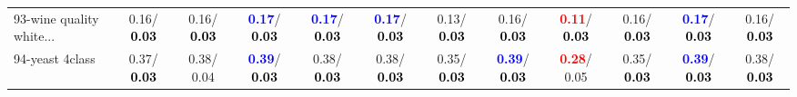 \begin{table}[h]
\begin{center}
{\begin{tabular}{lc|c|c|c|c|c|c|c|c|c|c}
93-wine quality white... &   0.16/\textcolor{black}{\textbf{  0.03}} &   0.16/\textcolor{black}{\textbf{  0.03}} & \textcolor{blue}{\textbf{  0.17}}/\textcolor{black}{\textbf{  0.03}} & \textcolor{blue}{\textbf{  0.17}}/\textcolor{black}{\textbf{  0.03}} & \textcolor{blue}{\textbf{  0.17}}/\textcolor{black}{\textbf{  0.03}} &   0.13/\textcolor{black}{\textbf{  0.03}} &   0.16/\textcolor{black}{\textbf{  0.03}} & \textcolor{red}{\textbf{  0.11}}/\textcolor{black}{\textbf{  0.03}} &   0.16/\textcolor{black}{\textbf{  0.03}} & \textcolor{blue}{\textbf{  0.17}}/\textcolor{black}{\textbf{  0.03}} &   0.16/\textcolor{black}{\textbf{  0.03}} \\
94-yeast 4class &   0.37/\textcolor{black}{\textbf{  0.03}} &   0.38/  0.04 & \textcolor{blue}{\textbf{  0.39}}/\textcolor{black}{\textbf{  0.03}} &   0.38/\textcolor{black}{\textbf{  0.03}} &   0.38/\textcolor{black}{\textbf{  0.03}} &   0.35/\textcolor{black}{\textbf{  0.03}} & \textcolor{blue}{\textbf{  0.39}}/\textcolor{black}{\textbf{  0.03}} & \textcolor{red}{\textbf{  0.28}}/  0.05 &   0.35/\textcolor{black}{\textbf{  0.03}} & \textcolor{blue}{\textbf{  0.39}}/\textcolor{black}{\textbf{  0.03}} &   0.38/\textcolor{black}{\textbf{  0.03}} \\\end{tabular}}\label{stratsALCKappa2aRFwRedux}
\end{center}
\end{table}
